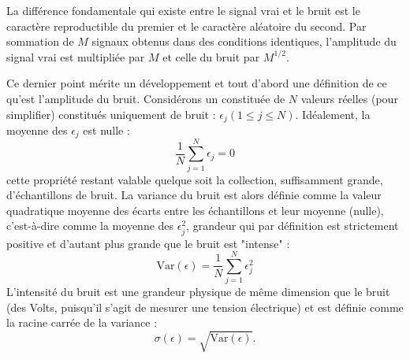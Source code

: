 La différence fondamentale qui existe entre le signal vrai et le bruit est le caractère 
reproductible du premier et le caractère aléatoire du second. 
Par sommation de $M$ signaux obtenus dans des conditions identiques, 
l'amplitude du signal vrai est multipliée 
par $M$ et celle du bruit par $M^{1/2}$.

Ce dernier point mérite un développement et tout d'abord une définition de
ce qu'est l'amplitude du bruit.
Considérons un {\FID} constituée de $N$ valeurs réelles (pour simplifier)
constitués uniquement de bruit : $\epsilon_j (1 \le j \le N)$.
Idéalement, la moyenne des $\epsilon_j$ est nulle :
\begin{equation}
\frac{1}{N}\sum_{j=1}^{N} \epsilon_j = 0
\end{equation}
cette propriété restant valable quelque soit la collection,
suffisamment grande, d'échantillons de bruit.
La variance du bruit est alors définie comme la valeur quadratique moyenne
des écarts entre les échantillons et leur moyenne (nulle),
c'est-à-dire comme la moyenne des $\epsilon_j^2$, grandeur qui par définition
est strictement positive et d'autant plus grande que le bruit est "intense" :
\begin{equation}
\mbox{Var}(\epsilon) = \frac{1}{N}\sum_{j=1}^{N} \epsilon_j^2
\end{equation}
L'intensité du bruit est une grandeur physique de même dimension
que le bruit (des Volts, puisqu'il s'agit de mesurer une tension électrique)
et est définie comme la racine carrée de la variance :
\begin{equation}
\sigma(\epsilon) = \sqrt{\mbox{Var}(\epsilon)}.
\end{equation}

